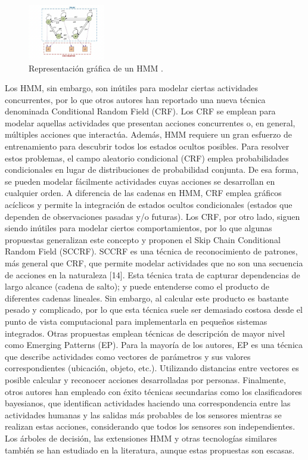 \documentclass{article}
\begin{document}
\begin{figure}[h]
\centering
\includegraphics[width=0.3\textwidth]{punto2.png}
\caption{\label{fig:frog}Representación gráfica de un HMM .}
\end{figure}

Los HMM, sin embargo, son inútiles para modelar ciertas actividades concurrentes, por lo que otros autores han reportado una nueva técnica denominada Conditional Random Field (CRF). Los CRF se emplean para modelar aquellas actividades que presentan acciones concurrentes o, en general, múltiples acciones que interactúa. Además, HMM requiere un gran esfuerzo de entrenamiento para descubrir todos los estados ocultos posibles. Para resolver estos problemas, el campo aleatorio condicional (CRF) emplea probabilidades condicionales en lugar de distribuciones de probabilidad conjunta. De esa forma, se pueden modelar fácilmente actividades cuyas acciones se desarrollan en cualquier orden. A diferencia de las cadenas en HMM, CRF emplea gráficos acíclicos y permite la integración de estados ocultos condicionales (estados que dependen de observaciones pasadas y/o futuras).
Los CRF, por otro lado, siguen siendo inútiles para modelar ciertos comportamientos, por lo que algunas propuestas generalizan este concepto y proponen el Skip Chain Conditional Random Field (SCCRF). SCCRF es una técnica de reconocimiento de patrones, más general que CRF, que permite modelar actividades que no son una secuencia de acciones en la naturaleza [14]. Esta técnica trata de capturar dependencias de largo alcance (cadena de salto); y puede entenderse como el producto de diferentes cadenas lineales. Sin embargo, al calcular este producto
es bastante pesado y complicado, por lo que esta técnica suele ser demasiado costosa desde el punto de vista computacional para implementarla en pequeños sistemas integrados.
Otras propuestas emplean técnicas de descripción de mayor nivel como Emerging Patterns (EP). Para la mayoría de los autores, EP es una técnica que describe actividades como vectores de parámetros y sus valores correspondientes (ubicación, objeto, etc.).  Utilizando distancias entre vectores es posible calcular y reconocer acciones desarrolladas por personas. Finalmente, otros autores han empleado con éxito técnicas secundarias como los clasificadores bayesianos, que identifican actividades haciendo una correspondencia entre las actividades humanas y las salidas más probables de los sensores mientras se realizan estas acciones, considerando que todos los sensores son independientes. Los árboles de decisión, las extensiones HMM y otras tecnologías similares también se han estudiado en la literatura, aunque estas propuestas son escasas.
\end{document}
